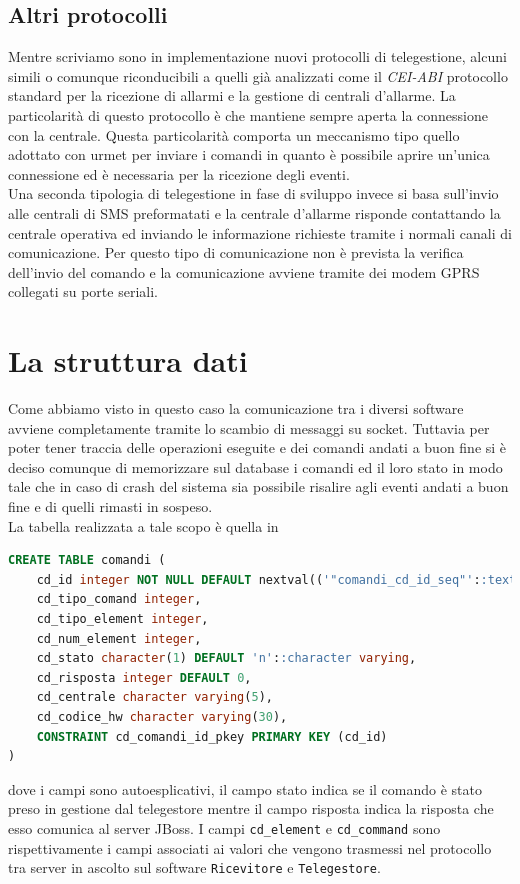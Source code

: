 \subsection{Altri protocolli}
Mentre scriviamo sono in implementazione nuovi protocolli di telegestione, alcuni simili o comunque riconducibili a quelli già analizzati come il \emph{CEI-ABI} protocollo standard per la ricezione di allarmi e la gestione di centrali d'allarme. La particolarità di questo protocollo è che mantiene sempre aperta la connessione con la centrale. Questa particolarità comporta un meccanismo tipo quello adottato con urmet per inviare i comandi in quanto è possibile aprire un'unica connessione ed è necessaria per la ricezione degli eventi.\\
Una seconda tipologia di telegestione in fase di sviluppo invece si basa sull'invio alle centrali di SMS preformatati e la centrale d'allarme risponde contattando la centrale operativa ed inviando le informazione richieste tramite i normali canali di comunicazione. Per questo tipo di comunicazione non è prevista la verifica dell'invio del comando e la comunicazione avviene tramite dei modem GPRS collegati su porte seriali.
\section{La struttura dati}
Come abbiamo visto in questo caso la comunicazione tra i diversi software avviene completamente tramite lo scambio di messaggi su socket. Tuttavia per poter tener traccia delle operazioni eseguite e dei comandi andati a buon fine si è deciso comunque di memorizzare sul database i comandi ed il loro stato in modo tale che in caso di crash del sistema sia possibile risalire agli eventi andati a buon fine e di quelli rimasti in sospeso.\\
La tabella realizzata a tale scopo è quella in 
\begin{lstlisting}[language=SQL,caption=Tabella comandi,label=lst:tabcodici]
CREATE TABLE comandi (
    cd_id integer NOT NULL DEFAULT nextval(('"comandi_cd_id_seq"'::text)::regclass),
    cd_tipo_comand integer,
    cd_tipo_element integer,
    cd_num_element integer,
    cd_stato character(1) DEFAULT 'n'::character varying,
    cd_risposta integer DEFAULT 0,
    cd_centrale character varying(5),
    cd_codice_hw character varying(30),
    CONSTRAINT cd_comandi_id_pkey PRIMARY KEY (cd_id)
)
\end{lstlisting}
dove i campi sono autoesplicativi, il campo stato indica se il comando è stato preso in gestione dal telegestore mentre il campo risposta indica la risposta che esso comunica al server JBoss. I campi \texttt{cd\_element} e \texttt{cd\_command} sono rispettivamente i campi associati ai valori che vengono trasmessi nel protocollo tra server in ascolto sul software \texttt{Ricevitore} e \texttt{Telegestore}.
